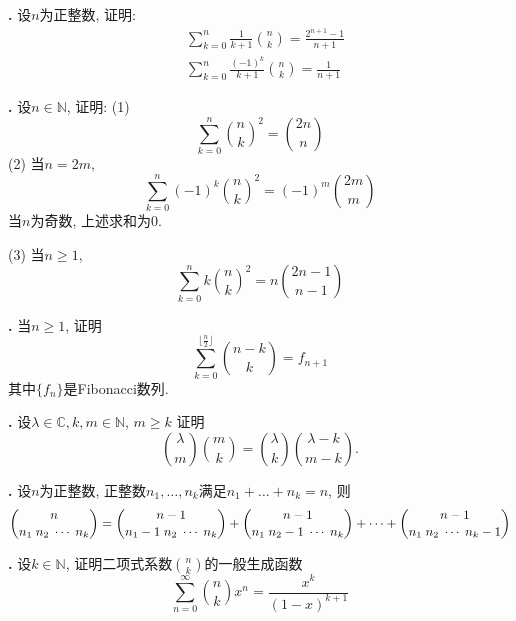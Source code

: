 \par \textbf{\theprobenum .} \cite{IC} 设$n$为正整数, 证明:
\begin{align}
    &\sum_{k=0}^n \frac{1}{k+1}\binom{n}{k}=\frac{2^{n+1}-1}{n+1}\\
    &\sum_{k=0}^n \frac{(-1)^k}{k+1}\binom{n}{k}=\frac{1}{n+1}
\end{align}


\par \textbf{\theprobenum .} 设$n\in \mathbb{N}$, 证明: (1)  
\begin{equation}
    \sum_{k=0}^n \binom{n}{k}^2 =\binom{2n}{n}
\end{equation}
(2) \cite{IC} 当$n=2m$, 
\begin{equation}
\sum^{n}_{k=0}(-1)^{k}\binom{n}{k}^2=(-1)^m\binom{2m}{m}
\end{equation}
当$n$为奇数, 上述求和为0. 
\par (3) \cite{IC} 当$n\ge 1$, 
\begin{equation}
\sum_{k=0}^{n} k\binom{n}{k}^2=n\binom{2n-1}{n-1}
\end{equation}

\par \textbf{\theprobenum .} \cite{IC} 当$n\ge 1$, 证明
\begin{equation}
    \sum_{k=0}^{\lfloor \frac{n}{2}\rfloor} \binom{n-k}{k} = f_{n+1}
\end{equation}
其中$\{f_n\}$是Fibonacci数列. 

\par \textbf{\theprobenum .} \cite{IC} 设$\lambda \in\mathbb{C},k,m\in\mathbb{N}$, $m\ge k$ 证明
\begin{displaymath}
\binom{\lambda}{m}\binom{m}{k}=\binom{\lambda}{k}\binom{\lambda-k}{m-k}.
\end{displaymath}

\par \textbf{\theprobenum .} 设$n$为正整数, 正整数$n_1,\dots,n_k$满足$n_1+\dots+n_k=n$, 则
\begin{equation}
    \small{
    \binom{n}{n_1\;n_2\;\cdots\;n_k} = \binom{n-1}{n_1-1\;n_2\;\cdots\;n_k} + \binom{n-1}{n_1\;n_2-1\;\cdots\;n_k} + \dots + \binom{n-1}{n_1\;n_2\;\cdots\;n_k-1}}
\end{equation}

\par \textbf{\theprobenum .} 设$k\in \mathbb{N}$, 证明二项式系数$\binom{n}{k}$的一般生成函数
\begin{equation}
    \sum_{n=0}^\infty \binom{n}{k} x^n = \frac{x^k}{(1-x)^{k+1}}
\end{equation}


